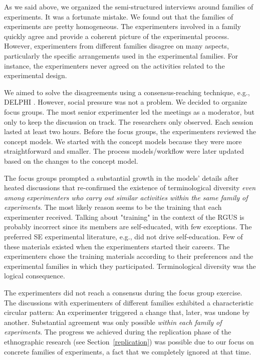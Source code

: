 As we said above, we organized the semi-structured interviews around families of experiments. It was a fortunate mistake. We found out that the families of experiments are pretty homogeneous. The experimenters involved in a family quickly agree and provide a coherent picture of the experimental process. However, experimenters from different families disagree on many aspects, particularly the specific arrangements used in the experimental families. For instance, the experimenters never agreed on the activities related to the experimental design.

We aimed to solve the disagreements using a consensus-reaching technique, e.g., DELPHI \cite{Dalkey-1967-Delphi}. However, social pressure was not a problem. We decided to organize focus groups. The most senior experimenter led the meetings as a moderator, but only to keep the discussion on track. The researchers only observed. Each session lasted at least two hours. Before the focus groups, the experimenters reviewed the concept models. We started with the concept models because they were more straightforward and smaller. The process models/workflow were later updated based on the changes to the concept model.

The focus groups prompted a substantial growth in the models' details after heated discussions that re-confirmed the existence of terminological diversity \textit{even among experimenters who carry out similar activities within the same family of experiments}. The most likely reason seems to be the training that each experimenter received. Talking about "training" in the context of the RGUS is probably incorrect since its members are self-educated, with few exceptions. The preferred SE experimental literature, e.g., \cite{Creswell-2009-Method-Approaches} \cite{montgomery-2019-Design-Analysis-Experiments} did not drive self-education. Few of these materials existed when the experimenters started their careers. The experimenters chose the training materials according to their preferences and the experimental families in which they participated. Terminological diversity was the logical consequence.

The experimenters did not reach a consensus during the focus group exercise. The discussions with experimenters of different families exhibited a characteristic circular pattern: An experimenter triggered a change that, later, was undone by another. Substantial agreement was only possible \textit{within each family of experiments}. The progress we achieved during the replication phase of the ethnographic research (see Section~\ref {replication}) was possible due to our focus on concrete families of experiments, a fact that we completely ignored at that time.

